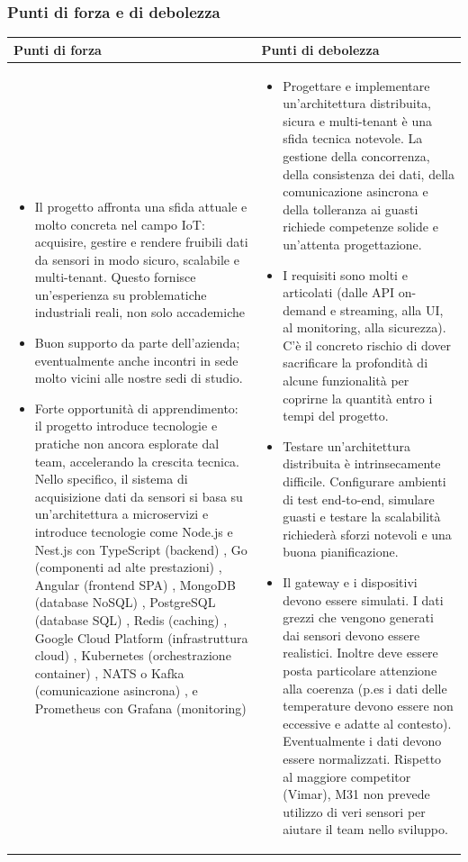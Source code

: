 \documentclass[a4paper,11pt]{article}
\begin{document}
\subsubsection{Punti di forza e di debolezza}
{\footnotesize
\begin{tabularx}{\textwidth}{|X|X|}
\hline
\rowcolor{lightgray!40} %
\textbf{Punti di forza} & \textbf{Punti di debolezza} \\
\hline
\begin{itemize}
\item  Il progetto affronta una sfida attuale e molto concreta nel campo IoT: acquisire, gestire e rendere fruibili dati da sensori in modo sicuro, scalabile e multi-tenant. Questo fornisce un'esperienza su problematiche industriali reali, non solo accademiche
\item Buon supporto da parte dell'azienda; eventualmente anche incontri in sede molto vicini alle nostre sedi di studio.
\item Forte opportunità di apprendimento: il progetto introduce tecnologie e pratiche non ancora esplorate dal team, accelerando la crescita tecnica. Nello specifico, il sistema di acquisizione dati da sensori si basa su un'architettura a microservizi e introduce tecnologie come Node.js e Nest.js con TypeScript (backend) , Go (componenti ad alte prestazioni) , Angular (frontend SPA) , MongoDB (database NoSQL) , PostgreSQL (database SQL) , Redis (caching) , Google Cloud Platform (infrastruttura cloud) , Kubernetes (orchestrazione container) , NATS o Kafka (comunicazione asincrona) , e Prometheus con Grafana (monitoring)
\end{itemize}
 & \begin{itemize}
\item Progettare e implementare un'architettura distribuita, sicura e multi-tenant è una sfida tecnica notevole. La gestione della concorrenza, della consistenza dei dati, della comunicazione asincrona e della tolleranza ai guasti richiede competenze solide e un'attenta progettazione.
\item 	I requisiti sono molti e articolati (dalle API on-demand e streaming, alla UI, al monitoring, alla sicurezza). C'è il concreto rischio di dover sacrificare la profondità di alcune funzionalità per coprirne la quantità entro i tempi del progetto.
\item Testare un'architettura distribuita è intrinsecamente difficile. Configurare ambienti di test end-to-end, simulare guasti e testare la scalabilità richiederà sforzi notevoli e una buona pianificazione.
\item  Il gateway e i dispositivi devono essere simulati. I dati grezzi che vengono generati dai sensori devono essere realistici. Inoltre deve essere posta particolare attenzione alla coerenza (p.es i dati delle temperature devono essere non eccessive e adatte al contesto). Eventualmente i dati devono essere normalizzati. Rispetto al maggiore competitor (Vimar), M31 non prevede utilizzo di veri sensori per aiutare il team nello sviluppo.
\end{itemize} \\
\hline
\end{tabularx}
}
\end{document}
